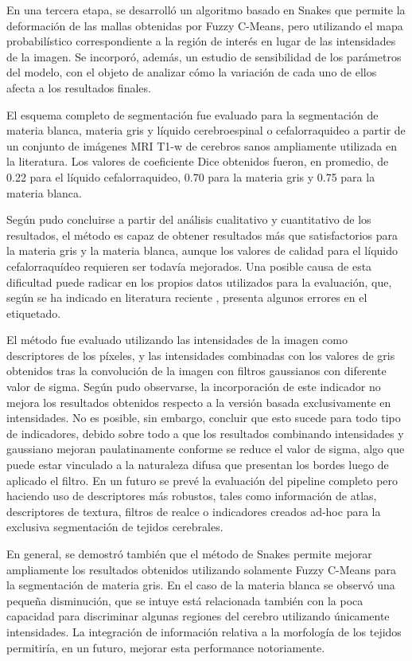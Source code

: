 En una tercera etapa, se desarrolló un algoritmo basado en Snakes que permite la deformación de las mallas obtenidas por Fuzzy C-Means, pero utilizando el mapa probabilístico correspondiente a la región de interés en lugar de las intensidades de la imagen. Se incorporó, además, un estudio de sensibilidad de los parámetros del modelo, con el objeto de analizar cómo la variación de cada uno de ellos afecta a los resultados finales.

El esquema completo de segmentación fue evaluado para la segmentación de materia blanca, materia gris y líquido cerebroespinal o cefalorraquideo a partir de un conjunto de imágenes MRI T1-w de cerebros sanos ampliamente utilizada en la literatura. Los valores de coeficiente Dice obtenidos fueron, en promedio, de 0.22 para el líquido cefalorraquideo, 0.70 para la materia gris y 0.75 para la materia blanca. 

Según pudo concluirse a partir del análisis cualitativo y cuantitativo de los resultados, el método es capaz de obtener resultados más que satisfactorios para la materia gris y la materia blanca, aunque los valores de calidad para el líquido cefalorraquídeo requieren ser todavía mejorados. Una posible causa de esta dificultad puede radicar en los propios datos utilizados para la evaluación, que, según se ha indicado en literatura reciente \citep{valverde2015comparison}, presenta algunos errores en el etiquetado. 

El método fue evaluado utilizando las intensidades de la imagen como descriptores de los píxeles, y las intensidades combinadas con los valores de gris obtenidos tras la convolución de la imagen con filtros gaussianos con diferente valor de sigma. Según pudo observarse, la incorporación de este indicador no mejora los resultados obtenidos respecto a la versión basada exclusivamente en intensidades. No es posible, sin embargo, concluir que esto sucede para todo tipo de indicadores, debido sobre todo a que los resultados combinando intensidades y gaussiano mejoran paulatinamente conforme se reduce el valor de sigma, algo que puede estar vinculado a la naturaleza difusa que presentan los bordes luego de aplicado el filtro. En un futuro se prevé la evaluación del pipeline completo pero haciendo uso de descriptores más robustos, tales como información de atlas, descriptores de textura, filtros de realce o indicadores creados ad-hoc para la exclusiva segmentación de tejidos cerebrales.

En general, se demostró también que el método de Snakes permite mejorar ampliamente los resultados obtenidos utilizando solamente Fuzzy C-Means para la segmentación de materia gris. En el caso de la materia blanca se observó una pequeña disminución, que se intuye está relacionada también con la poca capacidad para discriminar algunas regiones del cerebro utilizando únicamente intensidades. La integración de información relativa a la morfología de los tejidos permitiría, en un futuro, mejorar esta performance notoriamente.

